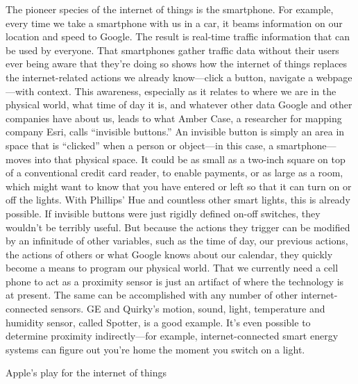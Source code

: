 The pioneer species of the internet of things is the smartphone. For example, every time we take a smartphone with us in a car, it beams information on our location and speed to Google. The result is real-time traffic information that can be used by everyone.
That smartphones gather traffic data without their users ever being aware that they’re doing so shows how the internet of things replaces the internet-related actions we already know—click a button, navigate a webpage—with context. This awareness, especially as it relates to where we are in the physical world, what time of day it is, and whatever other data Google and other companies have about us, leads to what Amber Case, a researcher for mapping company Esri, calls “invisible buttons.” An invisible button is simply an area in space that is “clicked” when a person or object—in this case, a smartphone—moves into that physical space. It could be as small as a two-inch square on top of a conventional credit card reader, to enable payments, or as large as a room, which might want to know that you have entered or left so that it can turn on or off the lights. With Phillips’ Hue and countless other smart lights, this is already possible.
If invisible buttons were just rigidly defined on-off switches, they wouldn’t be terribly useful. But because the actions they trigger can be modified by an infinitude of other variables, such as the time of day, our previous actions, the actions of others or what Google knows about our calendar, they quickly become a means to program our physical world.
That we currently need a cell phone to act as a proximity sensor is just an artifact of where the technology is at present. The same can be accomplished with any number of other internet-connected sensors. GE and Quirky’s motion, sound, light, temperature and humidity sensor, called Spotter, is a good example. It’s even possible to determine proximity indirectly—for example, internet-connected smart energy systems can figure out you’re home the moment you switch on a light.


Apple’s play for the internet of things

